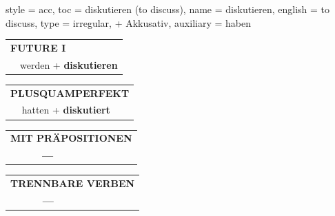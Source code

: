 \begin{verbentry}{
  style = {acc},
  toc = {diskutieren (to discuss)},
  name = {diskutieren},
  english = {to discuss},
  type = {irregular, + Akkusativ},
  auxiliary = {haben}
}
\begin{tabular}{rl}
    \multicolumn{2}{l}{\textbf{FUTURE I} }\\
  &  werden + \textbf{diskutieren}\\
 
  \end{tabular}
\hfill
   \begin{tabular}{rl}
      \multicolumn{2}{l}{\textbf{PLUSQUAMPERFEKT}}\\
  &  hatten + \textbf{diskutiert}\\
  \end{tabular}
  
  \vspace{10pt}

\begin{tabular}{lll}
\multicolumn{3}{l}{\textbf{MIT PRÄPOSITIONEN}}\\
& \textbf{---} & \\
\end{tabular}
\hfill
\begin{tabular}{lll}
\multicolumn{3}{l}{\textbf{TRENNBARE VERBEN}}\\
& \textbf{---} & \\
\end{tabular}

  \vspace{-5pt}
\end{verbentry}

